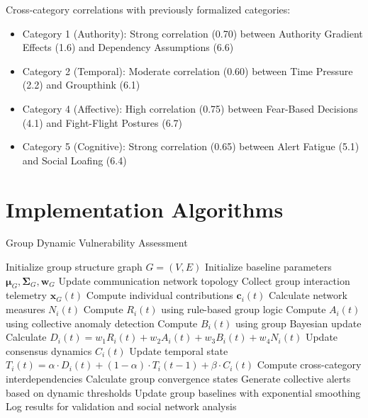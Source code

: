 \documentclass[11pt,a4paper]{article}
\begin{document}
Cross-category correlations with previously formalized categories:
\begin{itemize}
\item Category 1 (Authority): Strong correlation (0.70) between Authority Gradient Effects (1.6) and Dependency Assumptions (6.6)
\item Category 2 (Temporal): Moderate correlation (0.60) between Time Pressure (2.2) and Groupthink (6.1)
\item Category 4 (Affective): High correlation (0.75) between Fear-Based Decisions (4.1) and Fight-Flight Postures (6.7)
\item Category 5 (Cognitive): Strong correlation (0.65) between Alert Fatigue (5.1) and Social Loafing (6.4)
\end{itemize}

\section{Implementation Algorithms}

\begin{algorithm}
\caption{Group Dynamic Vulnerability Assessment}
\begin{algorithmic}[1]
\STATE Initialize group structure graph $G = (V, E)$
\STATE Initialize baseline parameters $\boldsymbol{\mu}_G, \boldsymbol{\Sigma}_G, \boldsymbol{w}_G$
    \STATE Update communication network topology
    \STATE Collect group interaction telemetry $\mathbf{x}_G(t)$
        \STATE Compute individual contributions $\mathbf{c}_i(t)$
        \STATE Calculate network measures $N_i(t)$
        \STATE Compute $R_i(t)$ using rule-based group logic
        \STATE Compute $A_i(t)$ using collective anomaly detection
        \STATE Compute $B_i(t)$ using group Bayesian update
        \STATE Calculate $D_i(t) = w_1 R_i(t) + w_2 A_i(t) + w_3 B_i(t) + w_4 N_i(t)$
        \STATE Update consensus dynamics $C_i(t)$
        \STATE Update temporal state $T_i(t) = \alpha \cdot D_i(t) + (1-\alpha) \cdot T_i(t-1) + \beta \cdot C_i(t)$
    \ENDFOR
    \STATE Compute cross-category interdependencies
    \STATE Calculate group convergence states
    \STATE Generate collective alerts based on dynamic thresholds
    \STATE Update group baselines with exponential smoothing
    \STATE Log results for validation and social network analysis
\ENDFOR
\end{algorithmic}
\end{algorithm}
\end{document}
